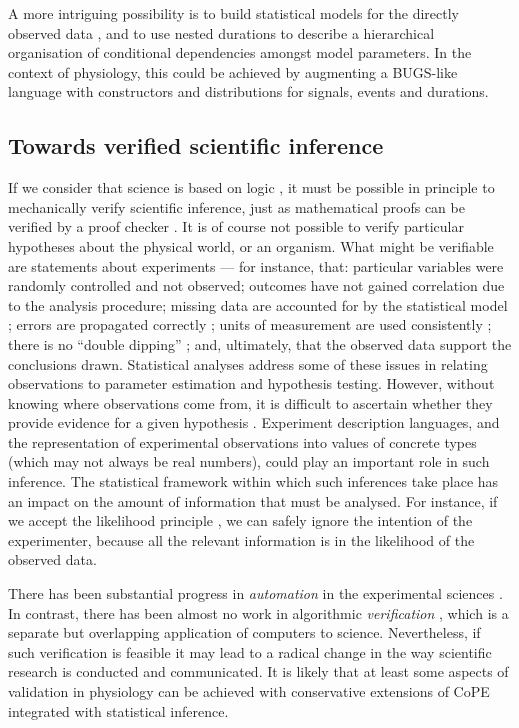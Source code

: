 A more intriguing possibility is to build statistical models for the
directly observed data \citep{Daniell1991}, and to use nested
durations to describe a hierarchical organisation \citep{Rouder2003}
of conditional dependencies amongst model parameters. In the context
of physiology, this could be achieved by augmenting a BUGS-like
\citep{Gilks1994} language with constructors and distributions for
signals, events and durations.


\subsection*{Towards verified scientific inference}

If we consider that science is based on logic \citep{Jaynes2003}, it
must be possible in principle to mechanically verify scientific
inference, just as mathematical proofs can be verified by a proof
checker \citep{Harrison2009}. It is of course not possible to verify
particular hypotheses about the physical world, or an organism. What
might be verifiable are statements about experiments --- for instance,
that: particular variables were randomly controlled and not observed;
outcomes have not gained correlation due to the analysis procedure;
missing data are accounted for by the statistical model
\citep{Gelman2003}; errors are propagated correctly
\citep{Taylor1997}; units of measurement are used consistently
\citep{Kennedy1997}; there is no ``double dipping''
\citep{Kriegeskorte2009}; and, ultimately, that the observed data
support the conclusions drawn. Statistical analyses address some of these
issues in relating observations to parameter estimation and hypothesis
testing. However, without knowing where observations come from, it is
difficult to ascertain whether they provide evidence for a given
hypothesis \citep{Pool2002}. Experiment description languages, and the
representation of experimental observations into values of concrete
types (which may not always be real numbers), could play an important
role in such inference. The statistical framework within which such
inferences take place has an impact on the amount of information that
must be analysed. For instance, if we accept the likelihood principle
\citep{Jaynes2003}, we can safely ignore the intention of the
experimenter, because all the relevant information is in the
likelihood of the observed data.

There has been substantial progress in \emph{automation} in the
experimental sciences \citep{King2004}. In contrast, there has been
almost no work in algorithmic \emph{verification} \citep{Kropf1999,
  Sadot}, which is a separate but overlapping application of
computers to science. Nevertheless, if such verification is
feasible it may lead to a radical change in the way scientific
research is conducted and communicated. It is likely that at least
some aspects of validation in physiology can be achieved with conservative
extensions of
CoPE integrated with statistical inference.

